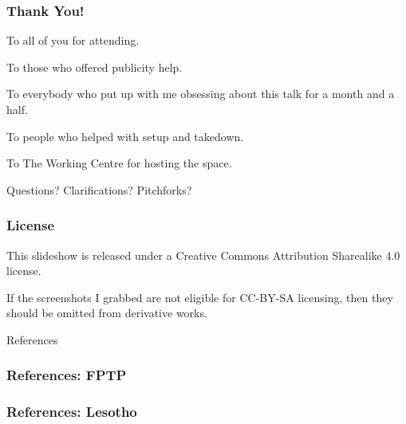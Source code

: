 \documentclass[14pt,t,hyperref={colorlinks=true,urlcolor=red}]{beamer}
\newcommand{\spooky}[1]{{\Huge \fontfamily{lgfz}\fontseries{m}\fontshape{n} \selectfont #1}}
\newcommand{\bigspookytext}[1]
{
\vspace{\stretch{1}}
\begin{center}
\spooky{#1}
\end{center}
\vspace{\stretch{1}}
}
\begin{document}

\begin{frame}
\frametitle{Thank You!}

To all of you for attending.

To those who offered publicity help.

To everybody who put up with me obsessing about this talk for a month
and a half.

To people who helped with setup and takedown.

To The Working Centre for hosting the space.

\end{frame}



\begin{frame}

\bigspookytext{Questions? Clarifications? Pitchforks?}

\end{frame}


\begin{frame}
\frametitle{License}

This slideshow is released under a Creative Commons Attribution
Sharealike 4.0 license. 

If the screenshots I grabbed are not eligible for CC-BY-SA licensing,
then they should be omitted from derivative works. 

\end{frame}



\begin{frame}

\bigspookytext{References}

\end{frame}



\begin{frame}[c,allowframebreaks]
\frametitle{References: FPTP}

\printbibliography[keyword=fptp,notkeyword=tallies]

\end{frame}



\begin{frame}[c,allowframebreaks]
\frametitle{References: Lesotho}


\printbibliography[keyword=lesotho,notkeyword=tallies]


\end{frame}
\end{document}
